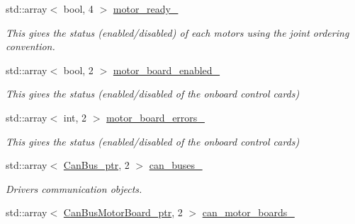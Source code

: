 \begin{DoxyCompactItemize}
\mbox{\label{classblmc__robots_1_1Teststand_a62df6b43c18e44f62114b6f4d34ba8f4}} 
std\+::array$<$ bool, 4 $>$ \hyperlink{classblmc__robots_1_1Teststand_a62df6b43c18e44f62114b6f4d34ba8f4}{motor\+\_\+ready\+\_\+}
\begin{DoxyCompactList}\small\item\em This gives the status (enabled/disabled) of each motors using the joint ordering convention. \end{DoxyCompactList}\item 
\mbox{\label{classblmc__robots_1_1Teststand_a1fca1e72202c09982c2e77c3166d1ea7}} 
std\+::array$<$ bool, 2 $>$ \hyperlink{classblmc__robots_1_1Teststand_a1fca1e72202c09982c2e77c3166d1ea7}{motor\+\_\+board\+\_\+enabled\+\_\+}
\begin{DoxyCompactList}\small\item\em This gives the status (enabled/disabled of the onboard control cards) \end{DoxyCompactList}\item 
\mbox{\label{classblmc__robots_1_1Teststand_a89f931457834d37bd01da57944fd21c1}} 
std\+::array$<$ int, 2 $>$ \hyperlink{classblmc__robots_1_1Teststand_a89f931457834d37bd01da57944fd21c1}{motor\+\_\+board\+\_\+errors\+\_\+}
\begin{DoxyCompactList}\small\item\em This gives the status (enabled/disabled of the onboard control cards) \end{DoxyCompactList}\item 
std\+::array$<$ \hyperlink{common__header_8hpp_a793c8789a7598e8aaf766939da7262af}{Can\+Bus\+\_\+ptr}, 2 $>$ \hyperlink{classblmc__robots_1_1Teststand_aab9d6924ad67f65a6931d3db4771c28a}{can\+\_\+buses\+\_\+}
\begin{DoxyCompactList}\small\item\em Drivers communication objects. \end{DoxyCompactList}\item 
\mbox{\label{classblmc__robots_1_1Teststand_a5ab181273e83c54a66ece2f741b718bb}} 
std\+::array$<$ \hyperlink{common__header_8hpp_aab1c6ddb1273247a1b45d5e8b417c216}{Can\+Bus\+Motor\+Board\+\_\+ptr}, 2 $>$ \hyperlink{classblmc__robots_1_1Teststand_a5ab181273e83c54a66ece2f741b718bb}{can\+\_\+motor\+\_\+boards\+\_\+}

\end{DoxyCompactItemize}
